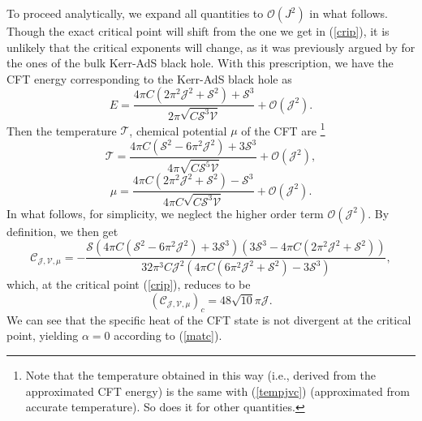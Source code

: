 \documentclass[a4paper,11pt]{article}
\newcommand{\eq}[1]{(\ref{#1})}
\def\T{\mathcal{T}} \def\O{\mathcal{O}} \def\S{\mathcal{S}}\def\J{\mathcal{J}}\def\V{\mathcal{V}}\def\Q{\mathcal{Q}}\def\F{\mathcal{F}}
\begin{document}
To proceed analytically, we expand all quantities to $\O\left(J^2\right)$ in what follows. Though the exact critical point will shift from the one we get in \eq{crip}, it is unlikely that the critical exponents will change, as it was previously argued by \cite{Altamirano:2014tva} for the ones of the bulk Kerr-AdS black hole. With this prescription, we have the CFT energy corresponding to the Kerr-AdS black hole as
\begin{equation}
E=\frac{4 \pi  C \left(2 \pi ^2 \J^2+\S^2\right)+\S^3}{2 \pi  \sqrt{C \S^3 \mathcal{V}}}+\O(\J^2).
\end{equation}
Then the temperature $\T$, chemical potential $\mu$ of the CFT are \footnote{Note that the temperature obtained in this way (i.e., derived from the approximated CFT energy) is the same with \eq{tempjvc} (approximated from accurate temperature). So does it for other quantities.}
\begin{equation}\label{cett}
\T=\frac{4 \pi  C \left(\S^2-6 \pi ^2 \J^2\right)+3 \S^3}{4 \pi  \sqrt{C \S^5 \mathcal{V}}}+\O(\J^2),
\end{equation}
\begin{equation}\label{cemm}
\mu=\frac{4 \pi  C \left(2 \pi ^2 \J^2+\S^2\right)-\S^3}{4 \pi  C \sqrt{C \S^3 \mathcal{V}}}+\O(\J^2).
\end{equation}
In what follows, for simplicity, we neglect the higher order term $\O(\J^2)$. By definition, we then get
\begin{equation}
\mathcal{C}_{\mathcal{J}, \mathcal{V}, \mu}=-\frac{\mathcal{S} \left(4 \pi  C \left(\mathcal{S}^2-6 \pi ^2 \mathcal{J}^2\right)+3 \mathcal{S}^3\right) \left(3 \mathcal{S}^3-4 \pi  C \left(2 \pi ^2 \mathcal{J}^2+\mathcal{S}^2\right)\right)}{32 \pi ^3 C \mathcal{J}^2 \left(4 \pi  C \left(6 \pi ^2 \mathcal{J}^2+\mathcal{S}^2\right)-3 \mathcal{S}^3\right)},
\end{equation}
which, at the critical point \eq{crip}, reduces to be
\begin{equation}
\left(\mathcal{C}_{\mathcal{J}, \mathcal{V}, \mu}\right)_c=48 \sqrt{10} \pi  \J.
\end{equation}
We can see that the specific heat of the CFT state is not divergent at the critical point, yielding $\alpha=0$ according to \eq{matc}.
\end{document}
